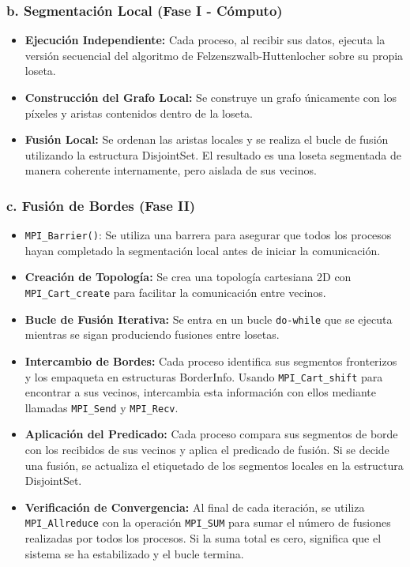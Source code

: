 \documentclass[fleqn,10pt]{article}
\begin{document}
\subsubsection*{b. Segmentación Local (Fase I - Cómputo)}
\begin{itemize}
    \item \textbf{Ejecución Independiente:} Cada proceso, al recibir sus datos, ejecuta la versión secuencial del algoritmo de Felzenszwalb-Huttenlocher sobre su propia loseta.
    \item \textbf{Construcción del Grafo Local:} Se construye un grafo únicamente con los píxeles y aristas contenidos dentro de la loseta.
    \item \textbf{Fusión Local:} Se ordenan las aristas locales y se realiza el bucle de fusión utilizando la estructura DisjointSet. El resultado es una loseta segmentada de manera coherente internamente, pero aislada de sus vecinos.
\end{itemize}

\subsubsection*{c. Fusión de Bordes (Fase II)}
\begin{itemize}
    \item \texttt{MPI\_Barrier()}: Se utiliza una barrera para asegurar que todos los procesos hayan completado la segmentación local antes de iniciar la comunicación.
    \item \textbf{Creación de Topología:} Se crea una topología cartesiana 2D con \texttt{MPI\_Cart\_create} para facilitar la comunicación entre vecinos.
    \item \textbf{Bucle de Fusión Iterativa:} Se entra en un bucle \texttt{do-while} que se ejecuta mientras se sigan produciendo fusiones entre losetas.
    \item \textbf{Intercambio de Bordes:} Cada proceso identifica sus segmentos fronterizos y los empaqueta en estructuras BorderInfo. Usando \texttt{MPI\_Cart\_shift} para encontrar a sus vecinos, intercambia esta información con ellos mediante llamadas \texttt{MPI\_Send} y \texttt{MPI\_Recv}.
    \item \textbf{Aplicación del Predicado:} Cada proceso compara sus segmentos de borde con los recibidos de sus vecinos y aplica el predicado de fusión. Si se decide una fusión, se actualiza el etiquetado de los segmentos locales en la estructura DisjointSet.
    \item \textbf{Verificación de Convergencia:} Al final de cada iteración, se utiliza \texttt{MPI\_Allreduce} con la operación \texttt{MPI\_SUM} para sumar el número de fusiones realizadas por todos los procesos. Si la suma total es cero, significa que el sistema se ha estabilizado y el bucle termina.
\end{itemize}
\end{document}
